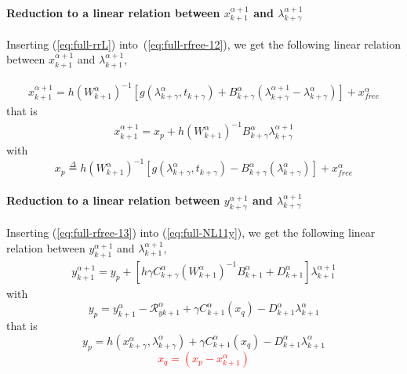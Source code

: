 \paragraph{Reduction to a linear relation between  $x^{\alpha+1}_{k+1}$ and
$\lambda^{\alpha+1}_{k+\gamma}$}

Inserting (\ref{eq:full-rrL}) into~(\ref{eq:full-rfree-12}), we get the following linear relation between $x^{\alpha+1}_{k+1}$ and
$\lambda^{\alpha+1}_{k+1}$, 

\begin{equation}
   \begin{array}{l}
     x^{\alpha+1}_{k+1} = h(W^{\alpha}_{k+1} )^{-1}\left[g(\lambda^{\alpha}_{k+\gamma},t_{k+\gamma}) +
    B^{\alpha}_{k+\gamma} (\lambda^{\alpha+1}_{k+\gamma} - \lambda^{\alpha}_{k+\gamma}) \right ] +x^\alpha_{free}
\end{array}
\end{equation}
that is 
\begin{equation}
  \begin{array}{l}
\boxed{x^{\alpha+1}_{k+1}=x_p + h (W^{\alpha}_{k+1})^{-1}    B^{\alpha}_{k+\gamma} \lambda^{\alpha+1}_{k+\gamma}}
   \end{array}
  \label{eq:full-rfree-13}
\end{equation}
with 
\begin{equation}
  \boxed{x_p \stackrel{\Delta}{=}  h(W^{\alpha}_{k+1} )^{-1}\left[g(\lambda^{\alpha}_{k+\gamma},t_{k+\gamma}) -B^{\alpha}_{k+\gamma} (\lambda^{\alpha}_{k+\gamma}) \right ] +x^\alpha_{free}}
\end{equation}


\paragraph{Reduction to a linear relation between  $y^{\alpha+1}_{k+\gamma}$ and
$\lambda^{\alpha+1}_{k+\gamma}$}

Inserting (\ref{eq:full-rfree-13}) into (\ref{eq:full-NL11y}), we get the following linear relation between $y^{\alpha+1}_{k+1}$ and $\lambda^{\alpha+1}_{k+1}$, 
\begin{equation}
   \begin{array}{l}
 y^{\alpha+1}_{k+1} = y_p + \left[ h \gamma C^{\alpha}_{k+\gamma} ( W^{\alpha}_{k+1})^{-1}  B^{\alpha}_{k+1} + D^{\alpha}_{k+1} \right]\lambda^{\alpha+1}_{k+1}
   \end{array}
\end{equation}
with 
\begin{equation}
y_p = y^{\alpha}_{k+1} -\mathcal R^{\alpha}_{yk+1} + \gamma C^{\alpha}_{k+1}(x_q) - D^{\alpha}_{k+1} \lambda^{\alpha}_{k+1} 
\end{equation}
that is 
\begin{equation}\boxed{
y_p =  h(x^{\alpha}_{k+\gamma},\lambda^{\alpha}_{k+\gamma}) + \gamma C^{\alpha}_{k+1}(x_q) - D^{\alpha}_{k+1} \lambda^{\alpha}_{k+1} }
\end{equation}
\textcolor{red}{
  \begin{equation}
   \boxed{ x_q=(x_p -x^{\alpha}_{k+1})\label{eq:full-xqq}}
  \end{equation}
}


